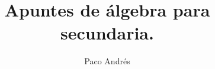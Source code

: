\documentclass[a4paper,11pt,answers]{exam}
\def \autor{Paco Andrés}
\def \titulo{Apuntes de álgebra para secundaria.}
\begin{document}
\title{\textbf{\titulo}}
\date{}
\author{\autor}
\maketitle

\begin{center}
  \doclicenseLongText\\
  \vspace{.25cm}
  \doclicenseImage
\end{center}
\tableofcontents
\newpage
\renewcommand{\abstractname}{\LARGE Introducción\\}
\vspace*{2cm}
\end{document}
